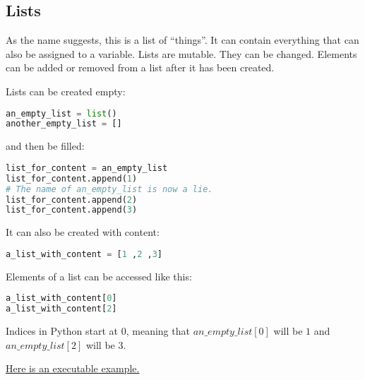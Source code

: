 \documentclass{article}
\begin{document}
\subsection{Lists}\label{lists}

As the name suggests, this is a list of ``things''.
It can contain everything that can also be assigned to a variable.
Lists are mutable. They can be changed.
Elements can be added or removed from a list after it has been created.

Lists can be created empty:

\begin{lstlisting}[language=Python]
an_empty_list = list()
another_empty_list = []
\end{lstlisting}

and then be filled:

\begin{lstlisting}[language=Python]
list_for_content = an_empty_list
list_for_content.append(1)
# The name of an_empty_list is now a lie.
list_for_content.append(2)
list_for_content.append(3)
\end{lstlisting}

It can also be created with content:

\begin{lstlisting}[language=Python]
a_list_with_content = [1 ,2 ,3]
\end{lstlisting}

Elements of a list can be accessed like this:

\begin{lstlisting}[language=Python]
a_list_with_content[0]
a_list_with_content[2]
\end{lstlisting}

Indices in Python start at 0, meaning that
$an\_empty\_list[0]$ will be $1$ and $an\_empty\_list[2]$
will be 3.

\href{http://pythontutor.com/visualize.html\#code=an\_empty\_list\%20\%3D\%20list\%28\%29\%0Aanother\_empty\_list\%20\%3D\%20\%5B\%5D\%0A\%0Alist\_for\_content\%20\%3D\%20an\_empty\_list\%0Alist\_for\_content.append\%281\%29\%0A\%23\%20The\%20name\%20of\%20an\_empty\_list\%20is\%20now\%20a\%20lie.\%0Alist\_for\_content.append\%282\%29\%0Alist\_for\_content.append\%283\%29\%0A\%0Aa\_list\_with\_content\%20\%3D\%20\%5B1\%20,2\%20,3\%5D\%0A\%0Aprint\%28an\_empty\_list\%29\%0Aprint\%28another\_empty\_list\%29\%0Aprint\%28list\_for\_content\%29\%0Aprint\%28a\_list\_with\_content\%29\%0A\%0Aprint\%28an\_empty\_list\%5B0\%5D\%29\%0Aprint\%28an\_empty\_list\%5B2\%5D\%29\&cumulative=false\&curInstr=13\&heapPrimitives=nevernest\&mode=display\&origin=opt-frontend.js\&py=3\&rawInputLstJSON=\%5B\%5D\&textReferences=false }
{Here is an executable example.}
\end{document}
